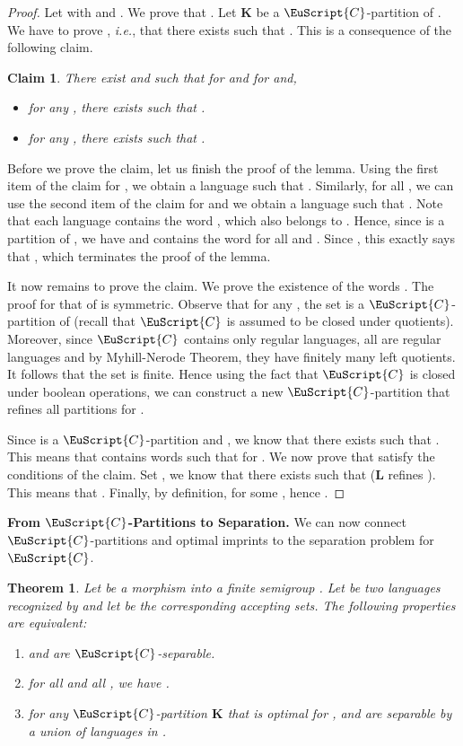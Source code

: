 \documentclass{CSML}
\newcommand\Cs{\ensuremath{\EuScript{C}}\xspace}
\newcommand\Kb{\ensuremath{\mathbf{K}}\xspace}
\newcommand\Lb{\ensuremath{\mathbf{L}}\xspace}
\theoremstyle{plain}
\newtheorem{theorem}[thm]{Theorem}
\newtheorem*{claim}{Claim}
\begin{document}
\begin{proof}
  Let  with  and . We prove that . Let \Kb be
  a \Cs-partition of . We have to prove ,
  \emph{i.e.}, that there exists  such that .
  This is a consequence of the following claim.

  \begin{claim}
    There exist  and  such
    that  for  and  for
     and,
    \begin{itemize}
    \item for any , there exists  such that
      .
    \item for any , there exists  such that
      .
    \end{itemize}
  \end{claim}
  Before we prove the claim, let us finish the proof of the lemma. Using
  the first item of the claim for , we obtain a language  such that . Similarly, for all
  , we can use the second item of the claim for  and
  we obtain a language  such that . Note that each language  contains the word ,
  which also belongs to . Hence, since  is a partition of ,
  we have  and  contains the word 
  for all  and . Since ,
  this exactly says that , which terminates the
  proof of the lemma.

  \smallskip
  It now remains to prove the claim. We prove the existence of the words . The proof for that of  is
  symmetric. Observe that for any , the set  is a \Cs-partition of  (recall that
  \Cs is assumed to be closed under quotients). Moreover, since \Cs
  contains only regular languages, all  are regular
  languages and by Myhill-Nerode Theorem, they have finitely many left
  quotients. It follows that the set  is
  finite. Hence using the fact that \Cs is closed under boolean
  operations, we can construct a new \Cs-partition  that refines
  all partitions  for .

  Since  is a \Cs-partition and , we know
  that there exists  such that .
  This means that  contains  words  such that  for . We now prove that
   satisfy the conditions of the claim. Set
  , we know that there exists  such that  (\Lb refines ). This means that . Finally, by definition,  for some ,
  hence .
\end{proof}

\noindent
{\bf From \Cs-Partitions to Separation.} We can now connect
\Cs-partitions and optimal imprints to the separation problem for
\Cs.

\begin{theorem} \label{thm:seppart}
  Let  be a morphism into a finite semigroup . Let
   be two languages recognized by  and let  be the corresponding accepting sets. The following
  properties are equivalent:
  \begin{enumerate}
  \item\label{item:cov2sep1}  and  are \Cs-separable.
  \item\label{item:cov2sep2} for all  and all , we have .
  \item\label{item:cov2sep3} for any \Cs-partition \Kb that is optimal
    for ,  and  are separable by a union of languages
    in .
  \end{enumerate}

\end{theorem}
\end{document}
